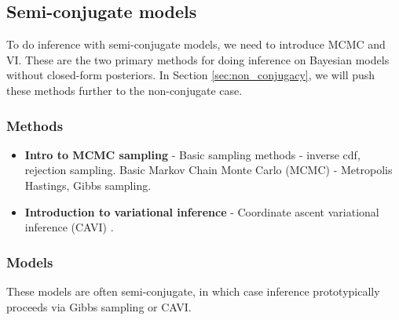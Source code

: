 \documentclass{article} %
\begin{document}



\subsection{Semi-conjugate models} \label{sec:semi_conjugacy}

To do inference with semi-conjugate models, we need to introduce MCMC and VI.  These are the two primary methods for doing inference on Bayesian models without closed-form posteriors. In Section \ref{sec:non_conjugacy}, we will push these methods further to the non-conjugate case.

\subsubsection{Methods}

\begin{itemize}
\item \textbf{Intro to MCMC sampling} - Basic sampling methods - inverse cdf,  rejection sampling. Basic Markov Chain Monte Carlo (MCMC) - Metropolis Hastings, Gibbs sampling.
\item \textbf{Introduction to variational inference} - Coordinate ascent variational inference (CAVI) \cite{wojnowiczXXXXfoundations}.
\end{itemize} 

\subsubsection{Models}
These models are often semi-conjugate, in which case inference prototypically proceeds via Gibbs sampling or CAVI. 
\end{document}
